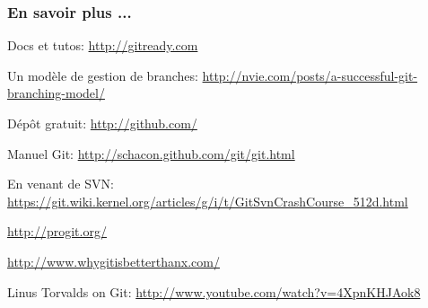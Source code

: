 
\begin{frame}\frametitle{En savoir plus ...}
  Docs et tutos: \url{http://gitready.com}

  Un modèle de gestion de branches: \url{http://nvie.com/posts/a-successful-git-branching-model/}

  Dépôt gratuit: \url{http://github.com/}

  Manuel Git: \url{http://schacon.github.com/git/git.html}

  En venant de SVN: \url{https://git.wiki.kernel.org/articles/g/i/t/GitSvnCrashCourse\_512d.html}

  \url{http://progit.org/}

  \url{http://www.whygitisbetterthanx.com/}

  Linus Torvalds on Git: \url{http://www.youtube.com/watch?v=4XpnKHJAok8}
\end{frame}

